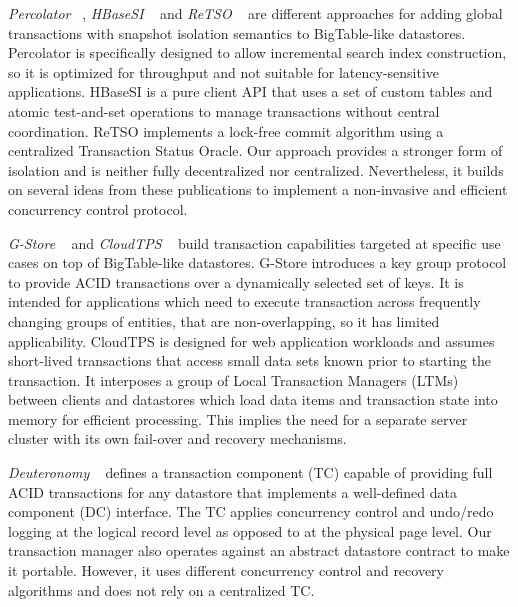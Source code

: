 \documentclass[10pt,final,journal]{IEEEtran}
\begin{document}
\emph{Percolator} ~\cite{Peng:2010:LIP:1924943.1924961}, \emph{HBaseSI} ~\cite{Zhang:2010:5697970} and \emph{ReTSO} ~\cite{Junqueira:2011:LTS:2056318.2057148} are different approaches for adding global transactions with snapshot isolation semantics to BigTable-like datastores. Percolator is specifically designed to allow incremental search index construction, so it is optimized for throughput and not suitable for latency-sensitive applications. HBaseSI is a pure client API that uses a set of custom tables and atomic test-and-set operations to manage transactions without central coordination. ReTSO implements a lock-free commit algorithm using a centralized Transaction Status Oracle. Our approach provides a stronger form of isolation and is neither fully decentralized nor centralized. Nevertheless, it builds on several ideas from these publications to implement a non-invasive and efficient concurrency control protocol.

\emph{G-Store} ~\cite{Das:2010:GSD:1807128.1807157} and \emph{CloudTPS} ~\cite{Wei:2011:5740834} build transaction capabilities targeted at specific use cases on top of BigTable-like datastores. G-Store introduces a key group protocol to provide ACID transactions over a dynamically selected set of keys. It is intended for applications which need to execute transaction across frequently changing groups of entities, that are non-overlapping, so it has limited applicability. CloudTPS is designed for web application workloads and assumes short-lived transactions that access small data sets known prior to starting the transaction. It interposes a group of Local Transaction Managers (LTMs) between clients and datastores which load data items and transaction state into memory for efficient processing. This implies the need for a separate server cluster with its own fail-over and recovery mechanisms.

\emph{Deuteronomy} ~\cite{Levandoski:2011:8530161} defines a transaction component (TC) capable of providing full ACID transactions for any datastore that implements a well-defined data component (DC) interface. The TC applies concurrency control and undo/redo logging at the logical record level as opposed to at the physical page level. Our transaction manager also operates against an abstract datastore contract to make it portable. However, it uses different concurrency control and recovery algorithms and does not rely on a centralized TC.
\end{document}
